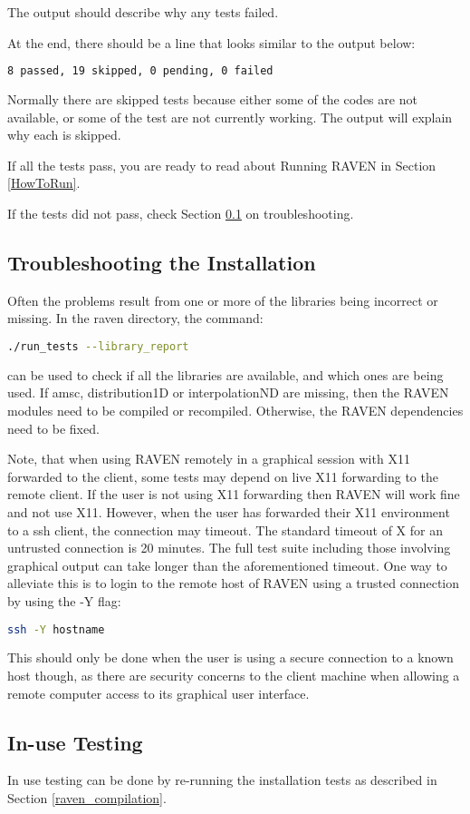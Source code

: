 The output should describe why any tests failed.

At the end, there should be a line that looks similar to the output below:
\begin{lstlisting}[language=bash]
8 passed, 19 skipped, 0 pending, 0 failed
\end{lstlisting}

Normally there are skipped tests because either some of the codes are
not available, or some of the test are not currently working.  The
output will explain why each is skipped.

If all the tests pass, you are ready to read about Running RAVEN in
Section \ref{HowToRun}.

If the tests did not pass, check Section
\ref{troubleshooting_installation} on troubleshooting.

\subsection{Troubleshooting the Installation}
\label{troubleshooting_installation}

Often the problems result from one or more of the libraries being
incorrect or missing.  In the raven directory, the command:

\begin{lstlisting}[language=bash]
./run_tests --library_report
\end{lstlisting}
can be used to check if all the libraries are available, and which
ones are being used.  If amsc, distribution1D or interpolationND are
missing, then the RAVEN modules need to be compiled or recompiled.
Otherwise, the RAVEN dependencies need to be fixed.

Note, that when using RAVEN remotely in a graphical session with X11
forwarded to the client, some tests may depend on live X11 forwarding
to the remote client. If the user is not using X11 forwarding then
RAVEN will work fine and not use X11.  However, when the user has
forwarded their X11 environment to a ssh client, the connection may
timeout. The standard timeout of X for an untrusted connection is 20
minutes.  The full test suite including those involving graphical
output can take longer than the aforementioned timeout. One way to
alleviate this is to login to the remote host of RAVEN using a trusted
connection by using the -Y flag:

\begin{lstlisting}[language=bash]
ssh -Y hostname
\end{lstlisting}

This should only be done when the user is using a secure connection to
a known host though, as there are security concerns to the client
machine when allowing a remote computer access to its graphical user
interface.


\subsection{In-use Testing}

In use testing can be done by re-running the installation tests as
described in Section \ref{raven_compilation}.
